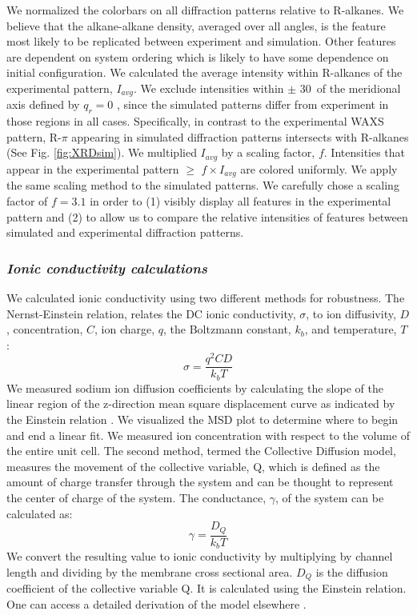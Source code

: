\documentclass[journal=jpcbfk,manusciprt=article]{achemso}
\begin{document}
  We normalized the colorbars on all diffraction patterns relative to
  R-alkanes. We believe that the alkane-alkane density, averaged over all angles,
  is the feature most likely to be replicated between experiment and simulation.
  Other features are dependent on system ordering which is likely to have some
  dependence on initial configuration. We calculated the average intensity within
  R-alkanes of the experimental pattern, $I_{avg}$. We exclude intensities within
  $\pm$ 30\degree~of the meridional axis defined by $q_r=0$ , since the simulated
  patterns differ from experiment in those regions in all cases. Specifically, in
  contrast to the experimental WAXS pattern, R-$\pi$ appearing in simulated
  diffraction patterns intersects with R-alkanes (See Fig. \ref{fig:XRDsim}). We
  multiplied $I_{avg}$ by a scaling factor, $f$. Intensities that appear in the
  experimental pattern $\geq$ $f\times I_{avg}$ are colored uniformly. We apply
  the same scaling method to the simulated patterns. We carefully chose a scaling
  factor of $f=3.1$ in order to (1) visibly display all features in the
  experimental pattern and (2) to allow us to compare the relative intensities of
  features between simulated and experimental diffraction patterns.

  \subsubsection{\textit{Ionic conductivity calculations}}

  We calculated ionic conductivity using two different methods for robustness.
  The Nernst-Einstein relation, relates the DC ionic conductivity, $\sigma$, to ion
  diffusivity, $D$, concentration, $C$, ion charge, $q$, the Boltzmann constant,
  $k_b$, and temperature, $T$: 
  \begin{equation}
	\sigma = \dfrac{q^2CD}{k_b T} 
	\label{eqn:nernst_einstein}
  \end{equation}
  We measured sodium ion diffusion coefficients by calculating the slope
  of the linear region of the z-direction mean square displacement curve as
  indicated by the Einstein relation \cite{einstein_investigations_1956}. We
  visualized the MSD plot to determine where to begin and end a linear fit. We
  measured ion concentration with respect to the volume of the entire unit cell. 
  The second method, termed the Collective Diffusion model, measures the
  movement of the collective variable, Q, which is defined as the amount of
  charge transfer through the system and can be thought to represent the center
  of charge of the system. The conductance, $\gamma$, of the system can be
  calculated as:
  \begin{equation}
	 \gamma = \dfrac{D_Q}{k_b T} 
	\label{eqn:collective_diffusion}
  \end{equation}
  We convert the resulting value to ionic conductivity by multiplying by
  channel length and dividing by the membrane cross sectional area. $D_Q$ is the
  diffusion coefficient of the collective variable Q. It is calculated using the
  Einstein relation. One can access a detailed derivation of the model elsewhere
  \cite{liu_collective_2013}.
\end{document}
